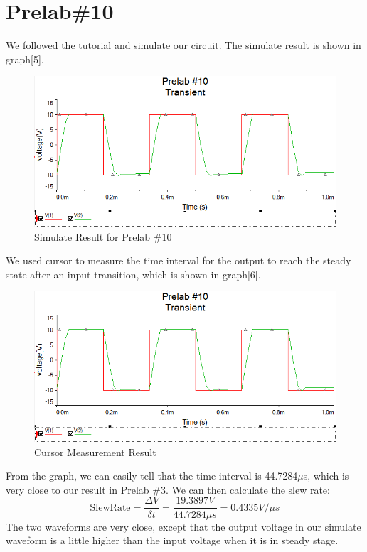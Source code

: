 \documentclass{IEEEtran}
\begin{document}
	\section{\textbf{Prelab\#10}}
	We followed the tutorial and simulate our circuit. The simulate result is shown in graph[5].
	\begin{figure}[!htbp]
		\centering
		\label{fig:1001}
		\begin{framed}
			\includegraphics[width=\linewidth]{images/10_1.PNG}
			\caption{Simulate Result for Prelab \#10}
		\end{framed}
	\end{figure}
	We used cursor to measure the time interval for the output to reach the steady state after an input transition, which is shown in graph[6].
	\begin{figure}[!htbp]
		\centering
		\label{fig:1002}
		\begin{framed}
			\includegraphics[width=\linewidth]{images/10_1.PNG}
			\caption{Cursor Measurement Result}
		\end{framed}
	\end{figure}
	From the graph, we can easily tell that the time interval is 44.7284$\mu$s, which is very close to our result in Prelab \#3. We can then calculate the slew rate:\\
	\begin{equation}
		\mathrm{SlewRate} = \frac{\Delta V}{\delta t} = \frac{19.3897 \si{V}}{44.7284\si{\mu s}} = 0.4335\si{V/\mu s}
	\end{equation}
	The two waveforms are very close, except that the output voltage in our simulate waveform is a little higher than the input voltage when it is in steady stage.\\
\end{document}
